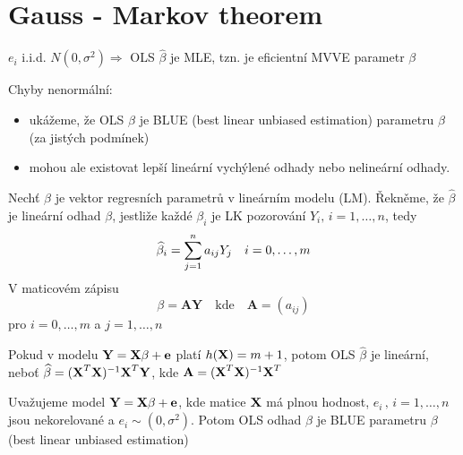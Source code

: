 \section{Gauss - Markov theorem}


$ e_i $ i.i.d. $ N(0,\sigma^{2}) \Rightarrow $ OLS $ \widehat{\beta} $ je MLE, tzn. je eficientní MVVE parametr $ \beta $

Chyby nenormální:
\begin{itemize}
	\item ukážeme, že OLS $ \widehat{\beta} $ je BLUE (best linear unbiased estimation) parametru $ \beta $ (za jistých podmínek)
	\item mohou ale existovat lepší lineární vychýlené odhady nebo nelineární odhady.
\end{itemize}

\begin{define}
	Nechť $ \beta $ je vektor regresních parametrů v lineárním modelu (LM). Řekněme, že $ \widehat{\beta} $ je lineární odhad $ \beta $, jestliže každé $ \beta_i $ je LK pozorování $ Y_i, \, i = 1, \dots , n $, tedy
	$$
		\widehat{\beta}_i = \sum\limits_{j=1}^{n} a_{ij} Y_j \quad i = 0, \dots ,m
	$$
V maticovém zápisu
	$$
		\beta = \textbf{AY} \quad \text{kde} \quad \textbf{A} = (a_{ij}) 
	$$
pro $ i = 0, \dots , m $ a $ j = 1, \dots , n $
\end{define}
\begin{remark}
 Pokud v modelu $ \textbf{Y} = \textbf{X} \beta + \textbf{e} $ platí $ h(\textbf{X}) = m+1 $, potom OLS $ \widehat{\beta} $ je lineární, neboť $ \widehat{\beta} = ( \textbf{X}^{T} \textbf{X} )^{-1} \textbf{X} ^{T} \textbf{Y} $, kde $ \textbf{A} = ( \textbf{X}^{T} \textbf{X} )^{-1} \textbf{X} ^{T}  $
\end{remark}
\begin{theorem}
	Uvažujeme model $ \textbf{Y} = \textbf{X} \beta + \textbf{e} $, kde matice $ \textbf{X} $ má plnou hodnost, $ e_i \, , \, i = 1, \dots , n $ jsou nekorelované a $ e_i \sim (0, \sigma^{2}) $. Potom OLS odhad $ \widehat{\beta} $ je BLUE parametru $ \beta $ (best linear unbiased estimation)
\end{theorem}
